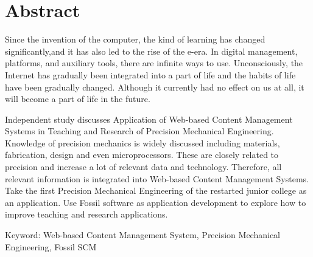\chapter*{Abstract}
\renewcommand{\baselinestretch}{1} %
\twelve Since the invention of the computer, the kind of learning has changed significantly,and it has also led to the rise of the e-era. In digital management, platforms, and auxiliary tools, there are infinite ways to use. Unconsciously, the Internet has gradually been integrated into a part of life and the habits of life have been gradually changed. Although it currently had no effect on us at all, it will become a part of life in the future. 
\\
\par
\renewcommand{\baselinestretch}{1}
\twelve Independent study discusses Application of Web-based Content Management Systems in Teaching and Research of Precision Mechanical Engineering. Knowledge of precision mechanics is widely discussed including materials, fabrication, design and even microprocessors. These are closely related to precision and increase a lot of relevant data and technology. Therefore, all relevant information is integrated into Web-based Content Management Systems. Take the first Precision Mechanical Engineering of the restarted junior college as an application. Use Fossil software as application development to explore how to improve teaching and research applications.
\\
\par
\begin{center}
\twelve Keyword: Web-based Content Management System, Precision Mechanical Engineering, Fossil SCM
\end{center}
\par
